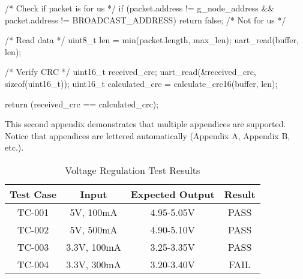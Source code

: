 \documentclass[titlecase]{capstone_report}
\begin{document}
\begin{reportcpp}[caption=Full Protocol Implementation]
{    /* Check if packet is for us */
    if (packet.address != g_node_address && packet.address != BROADCAST_ADDRESS) {
        return false;  /* Not for us */
    }
    
    /* Read data */
    uint8_t len = min(packet.length, max_len);
    uart_read(buffer, len);
    
    /* Verify CRC */
    uint16_t received_crc;
    uart_read(&received_crc, sizeof(uint16_t));
    uint16_t calculated_crc = calculate_crc16(buffer, len);
    
    return (received_crc == calculated_crc);
}
\end{reportcpp}


This second appendix demonstrates that multiple appendices are supported. Notice that appendices are lettered automatically (Appendix A, Appendix B, etc.).

\begin{table}[h]
    \centering
    \begin{tabular}{|c|c|c|c|}
        \hline
        \textbf{Test Case} & \textbf{Input} & \textbf{Expected Output} & \textbf{Result} \\
        \hline
        TC-001 & 5V, 100mA & 4.95-5.05V & PASS \\
        TC-002 & 5V, 500mA & 4.90-5.10V & PASS \\
        TC-003 & 3.3V, 100mA & 3.25-3.35V & PASS \\
        TC-004 & 3.3V, 300mA & 3.20-3.40V & FAIL \\
        \hline
    \end{tabular}
    \caption{Voltage Regulation Test Results}
    \label{tab:voltage-tests}
\end{table}
\end{document}
